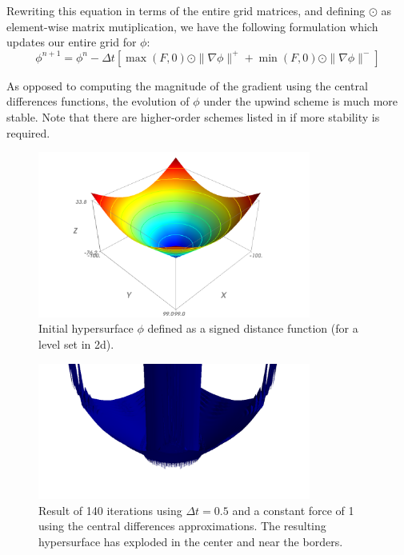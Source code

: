 \documentclass{article}
\begin{document}
Rewriting this equation in terms of the entire grid matrices, and defining
$\odot$ as element-wise matrix mutiplication, we have the following formulation
which updates our entire grid for $\phi$:
\[
\phi^{n+1} = \phi^{n} - \Delta t [ \max(F, 0) \odot \| \nabla \phi \|^{+} +
\min(F, 0) \odot \| \nabla \phi \|^{-} ]
\]

As opposed to computing the magnitude of the gradient using the central
differences functions, the evolution of $\phi$ under the upwind scheme is much
more stable. Note that there are higher-order schemes listed in
\cite{sethian1999level} if more stability is required.

\begin{figure}[H]
  \centering
  \includegraphics[width=0.8\textwidth]{img/up01.png}
  \caption{Initial hypersurface $\phi$ defined as a signed distance function
  (for a level set in 2d).}    
\end{figure}

\begin{figure}[H]
  \centering
  \includegraphics[width=0.8\textwidth]{img/up03.png}
  \caption{Result of 140 iterations using $\Delta t = 0.5$ and a constant force
  of 1 using the central differences approximations. The resulting hypersurface
  has exploded in the center and near the borders.}    
\end{figure}
\end{document}
